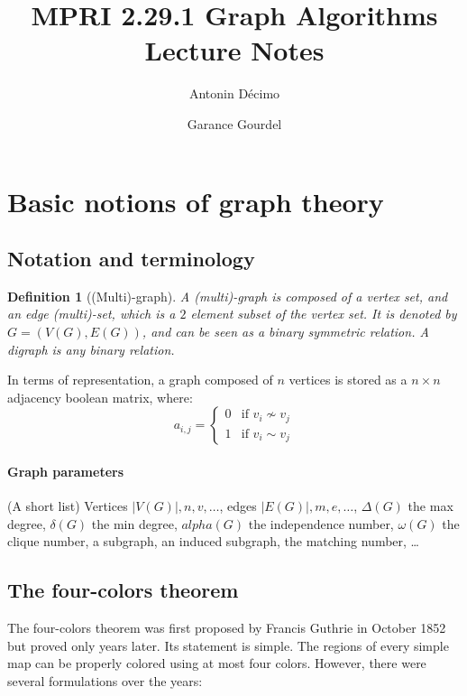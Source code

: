 \documentclass[12pt,a4paper]{article}
\title{MPRI 2.29.1 Graph Algorithms Lecture Notes\footnotemark}
\author{Antonin Décimo \and Garance Gourdel}
\newtheorem{definition}{Definition}
\begin{document}
\maketitle
{\hypersetup{hidelinks}
\tableofcontents
}


\section{Basic notions of graph theory}

\subsection{Notation and terminology}

\begin{definition}[(Multi)-graph] A (multi)-graph is composed of a vertex set,
  and an edge (multi)-set, which is a \(2\) element subset of the vertex set.
  It is denoted by \(G = (V(G), E(G))\), and can be seen as a binary symmetric
  relation. A digraph is any binary relation.
\end{definition}

In terms of representation, a graph composed of \(n\) vertices is stored as a
\(n \times n\) adjacency boolean matrix, where:
\[a_{i, j} = \begin{cases}
    0 & \text{if } v_i \not\sim v_j\\
    1 & \text{if } v_i \sim v_j
  \end{cases}\]

\paragraph{Graph parameters} (A short list) Vertices \(|V(G)|, n, v, \dots\),
edges \(|E(G)|, m, e, \dots\), \(\Delta(G)\) the max degree, \(\delta(G)\) the
min degree, \(alpha(G)\) the independence number, \(\omega(G)\) the clique
number, a subgraph, an induced subgraph, the matching number, …

\subsection{The four-colors theorem}
The four-colors theorem was first proposed by Francis Guthrie in October 1852
but proved only years later.  Its statement is simple.  The regions of every
simple map can be properly colored using at most four colors.  However, there
were several formulations over the years:
\end{document}
